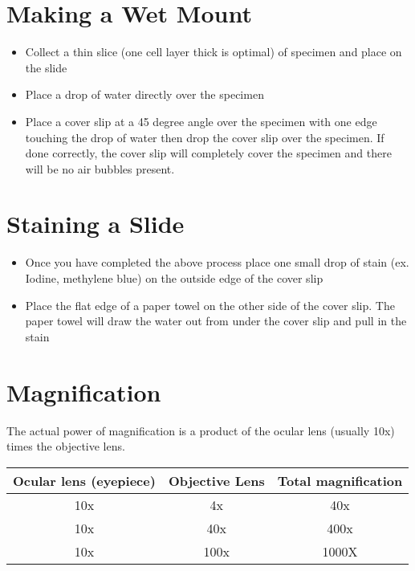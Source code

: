 \section{Making a Wet Mount}

\begin{itemize}

\item{Collect a thin slice (one cell layer thick is optimal) of specimen and place on the slide}

\item{Place a drop of water directly over the specimen}

\item{Place a cover slip at a 45 degree angle over the specimen with one edge touching the drop of water then drop the cover slip over the specimen. If done correctly, the cover slip will completely cover the specimen and there will be no air bubbles present.}

\end{itemize}

\section{Staining a Slide}

\begin{itemize}

\item{Once you have completed the above process place one small drop of stain (ex. Iodine, methylene blue) on the outside edge of the cover slip}

\item{Place the flat edge of a paper towel on the other side of the cover slip. The paper towel will draw the water out from under the cover slip and pull in the stain}

\end{itemize}

\section{Magnification}
The actual power of magnification is a product of the ocular lens (usually 10x) times the objective lens.

\begin{center}
\begin{tabular}{ | c | c | c | }
\hline
Ocular lens (eyepiece) & Objective Lens & Total magnification \\ \hline
10x & 4x & 40x \\ \hline
10x & 40x & 400x \\ \hline
10x & 100x & 1000X \\
\hline
\end{tabular}
\end{center}

